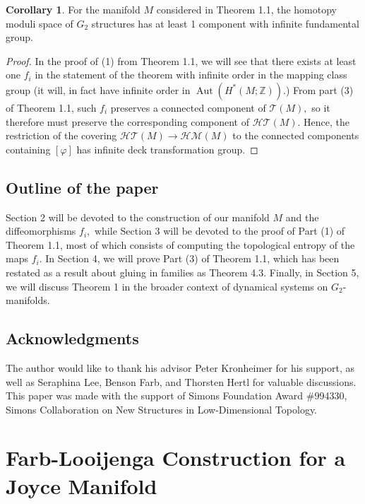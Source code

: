 \documentclass{amsart}
\theoremstyle{theorem}
\theoremstyle{definition}
\theoremstyle{definition}
\theoremstyle{definition}
\theoremstyle{theorem}
\theoremstyle{theorem}
\theoremstyle{theorem}
\theoremstyle{corollary}
\newtheorem{corollary}[theorem]{Corollary}
\theoremstyle{question}
\theoremstyle{remark}
\DeclareMathOperator{\Aut}{Aut}
\begin{document}
\begin{corollary}\label{Hertl}
    For the manifold $M$ considered in Theorem 1.1, the homotopy moduli space of $G_2$ structures has at least 1 component with infinite fundamental group.
\end{corollary}

\begin{proof}
    In the proof of (1) from Theorem 1.1, we will see that there exists at least one $f_i$ in the statement of the theorem with infinite order in the mapping class group (it will, in fact have infinite order in $\Aut(H^*(M; \mathbb{Z}))$.) From part (3) of Theorem 1.1, such $f_i$ preserves a connected component of $\mathcal{T}(M),$ so it therefore must preserve the corresponding component of $\mathcal{HT}(M).$ Hence, the restriction of the covering $\mathcal{HT}(M)\to\mathcal{HM}(M)$ to the connected components containing $[\varphi]$ has infinite deck transformation group.
\end{proof}

\subsection{Outline of the paper} Section 2 will be devoted to the construction of our manifold $M$ and the diffeomorphisms $f_i,$ while Section 3 will be devoted to the proof of Part (1) of Theorem 1.1, most of which consists of computing the topological entropy of the maps $f_i.$ In Section 4, we will prove Part (3) of Theorem 1.1, which has been restated as a result about gluing in families as Theorem 4.3. Finally, in Section 5, we will discuss Theorem 1 in the broader context of dynamical systems on $G_2$-manifolds.  

\subsection{Acknowledgments} The author would like to thank his advisor Peter Kronheimer for his support, as well as Seraphina Lee, Benson Farb, and Thorsten Hertl for valuable discussions. This paper was made with the support of Simons Foundation Award $\#$994330, Simons Collaboration on New Structures
in Low-Dimensional Topology.

\section{Farb-Looijenga Construction for a Joyce Manifold}
\end{document}
